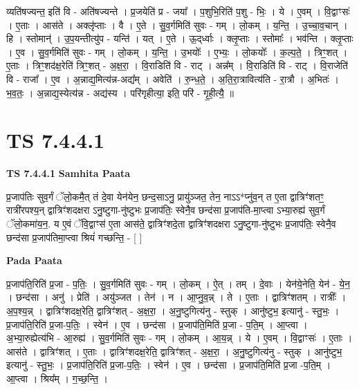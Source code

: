\documentclass[17pt]{extarticle}
\begin{document}
व्यति॑षज्यन्त॒ इति॑ वि - अति॑षज्यन्ते । प्र॒जयेति॑ प्र - जया᳚ । प॒शुभि॒रिति॑ प॒शु - भिः॒ । ये । ए॒वम् । वि॒द्वाꣳसः॑ । ए॒ताः । आस॑ते । अक्लृ॑प्ताः । वै । ए॒ते । सु॒व॒र्गमिति॑ सुवः - गम् । लो॒कम् । य॒न्ति॒ । उ॒च्चा॒व॒चान् । हि । स्तोमान्॑ । उ॒प॒यन्तीत्यु॑प - यन्ति॑ । यत् । ए॒ते । ऊ॒द्‌र्ध्वाः । क्लृ॒प्ताः । स्तोमाः᳚ । भव॑न्ति । क्लृ॒प्ताः । ए॒व । सु॒व॒र्गमिति॑ सुवः - गम् । लो॒कम् । य॒न्ति॒ । उ॒भयोः᳚ । ए॒भ्यः॒ । लो॒कयोः᳚ । क॒ल्प॒ते॒ । त्रिꣳ॒॒शत् । ए॒ताः । त्रिꣳ॒॒शद॑क्ष॒रेति॑ त्रिꣳ॒॒शत् - अ॒क्ष॒रा॒ । वि॒राडिति॑ वि - राट् । अन्न᳚म् । वि॒राडिति॑ वि - राट् । वि॒राजेति॑ वि - राजा᳚ । ए॒व । अ॒न्नाद्य॒मित्य॑न्न-अद्य᳚म् । अवेति॑ । रु॒न्ध॒ते॒ । अ॒ति॒रा॒त्रावित्य॑ति - रा॒त्रौ । अ॒भितः॑ । भ॒व॒तः॒ । अ॒न्नाद्य॒स्येत्य॑न्न - अद्य॑स्य । परि॑गृहीत्या॒ इति॒ परि॑ - गृ॒ही॒त्यै॒ ॥  \newline





\section{ TS 7.4.4.1 }

\textbf{TS 7.4.4.1 } \newline
\textbf{Samhita Paata} \newline

प्र॒जाप॑तिः सुव॒र्गं ॅलो॒कमै॒त् तं दे॒वा येन॑येन॒ छन्द॒साऽनु॒ प्रायु॑ञ्जत॒ तेन॒ नाऽऽ*प्नु॑व॒न् त ए॒ता द्वात्रिꣳ॑शतꣳ॒॒ रात्री॑रपश्य॒न् द्वात्रिꣳ॑शदक्षरा ऽनु॒ष्टुगा-नु॑ष्टुभः प्र॒जाप॑तिः॒ स्वेनै॒व छन्द॑सा प्र॒जाप॑ति-मा॒प्त्वा ऽभ्या॒रुह्य॑ सुव॒र्गं ॅलो॒कमा॑य॒न॒. य ए॒वं ॅवि॒द्वाꣳस॑ ए॒ता आस॑ते॒ द्वात्रिꣳ॑शदे॒ता द्वात्रिꣳ॑शदक्षरा ऽनु॒ष्टुगा-नु॑ष्टुभः प्र॒जाप॑तिः॒ स्वेनै॒व छन्द॑सा प्र॒जाप॑तिमा॒प्त्वा श्रियं॑ गच्छन्ति॒ - [  ] \newline

\textbf{Pada Paata} \newline

प्र॒जाप॑ति॒रिति॑ प्र॒जा - प॒तिः॒ । सु॒व॒र्गमिति॑ सुवः - गम् । लो॒कम् । ऐ॒त् । तम् । दे॒वाः । येन॑ये॒नेति॒ येन॑ - ये॒न॒ । छन्द॑सा । अनु॑ । प्रेति॑ । अयु॑ञ्जत । तेन॑ । न । आ॒प्नु॒व॒न्न् । ते । ए॒ताः । द्वात्रिꣳ॑शतम् । रात्रीः᳚ । अ॒प॒श्य॒न्न् । द्वात्रिꣳ॑शदक्ष॒रेति॒ द्वात्रिꣳ॑शत् - अ॒क्ष॒रा॒ । अ॒नु॒ष्टुगित्य॑नु - स्तुक् । आनु॑ष्टुभ॒ इत्यानु॑ - स्तु॒भः॒ । प्र॒जाप॑ति॒रिति॑ प्र॒जा-प॒तिः॒ । स्वेन॑ । ए॒व । छन्द॑सा । प्र॒जाप॑ति॒मिति॑ प्र॒जा - प॒ति॒म् । आ॒प्त्वा । अ॒भ्या॒रुह्येत्य॑भि - आ॒रुह्य॑ । सु॒व॒र्गमिति॑ सुवः - गम् । लो॒कम् । आ॒य॒न्न् । ये । ए॒वम् । वि॒द्वाꣳसः॑ । ए॒ताः । आस॑ते । द्वात्रिꣳ॑शत् । ए॒ताः । द्वात्रिꣳ॑शदक्ष॒रेति॒ द्वात्रिꣳ॑शत् - अ॒क्ष॒रा॒ । अ॒नु॒ष्टुगित्य॑नु - स्तुक् । आनु॑ष्टुभ॒ इत्यानु॑ - स्तु॒भः॒ । प्र॒जाप॑ति॒रिति॑ प्र॒जा-प॒तिः॒ । स्वेन॑ । ए॒व । छन्द॑सा । प्र॒जाप॑ति॒मिति॑ प्र॒जा -प॒ति॒म् । आ॒प्त्वा । श्रिय᳚म् । ग॒च्छ॒न्ति॒ ।  \newline
\end{document}
